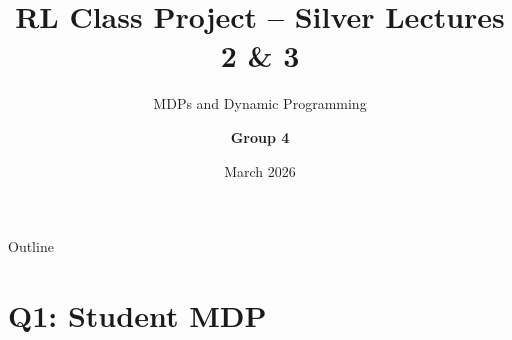\documentclass[aspectratio=169,12pt]{beamer}
\title[RL -- Silver L2 \& L3]{%
  \textbf{RL Class Project -- Silver Lectures 2 \& 3}}
\subtitle{MDPs and Dynamic Programming}
\author{\textbf{Group 4}}
\date{March 2026}
\institute{National Economics University}
\begin{document}

\begin{frame}
  \titlepage
\end{frame}

\begin{frame}{Outline}
  \tableofcontents
\end{frame}

\section{Q1: Student MDP}
\end{document}
